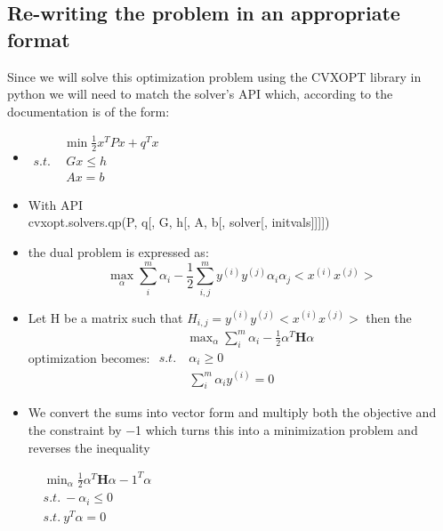 \documentclass[12pt]{article}
\begin{document}




\subsection{Re-writing the problem in an appropriate format}
Since we will solve this optimization problem using the CVXOPT library in python we will need to match the solver's API which, according to the documentation is of the form:


\begin{itemize}

\item $\begin{aligned}
    & \min \frac{1}{2} x^TPx + q^Tx
    \\
     s.t. \ & \ Gx \leq h 
    \\
    & \ Ax = b
\end{aligned}$
\item With API \\
cvxopt.solvers.qp(P, q[, G, h[, A, b[, solver[, initvals]]]])



\item the dual problem is expressed as:
$$\max_{\alpha} \sum_i^m \alpha_i - \frac{1}{2} \sum_{i,j}^m y^{(i)}y^{(j)} \alpha_i \alpha_j <x^{(i)} x^{(j)}>$$

\item Let H be a matrix such that $ H_{i,j} = y^{(i)}y^{(j)} <x^{(i)} x^{(j)}>$  then the optimization becomes:
$\begin{aligned}
    & \max_{\alpha} \sum_i^m \alpha_i  - \frac{1}{2}  \alpha^T \mathbf{H}  \alpha
    \\
     s.t. & \ \alpha_i \geq 0 
    \\
    &  \ \sum_i^m \alpha_i y^{(i)} = 0  
\end{aligned}$

\item We convert the sums into vector form and multiply both the objective and the constraint by −1 which turns this into a minimization problem and reverses the inequality

$\begin{aligned}
    & \min_{\alpha}  \frac{1}{2}  \alpha^T \mathbf{H}  \alpha - 1^T \alpha
    \\
    & s.t. \ - \alpha_i \leq 0 
    \\
    & s.t. \ y^T \alpha = 0 
\end{aligned}$


\end{itemize}
\end{document}
